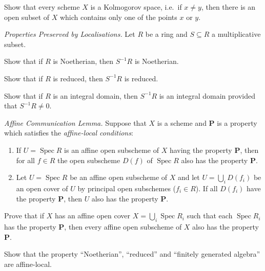 \documentclass[12pt]{book}
\theoremstyle{definition}
\DeclareMathOperator{\Spec}{Spec}
\begin{document}
	\begin{problems}
		\item Show that every scheme $X$ is a Kolmogorov space, i.e.~if $x \neq y$, then there is an open subset of $X$ which contains only one of the points $x$ or $y$.
		
		
		\item\label{chap5:properties-preserved-by-localisations} \textit{Properties Preserved by Localisations.} Let $R$ be a ring and $S \subseteq R$ a multiplicative subset.
		\begin{problems}
			\item Show that if $R$ is Noetherian, then $S^{-1}R$ is Noetherian.
			
			\item Show that if $R$ is reduced, then $S^{-1}R$ is reduced.
			
			\item Show that if $R$ is an integral domain, then $S^{-1}R$ is an integral domain provided that $S^{-1}R \neq 0$.
		\end{problems} 
		
		\item \textit{Affine Communication Lemma.} Suppose that $X$ is a scheme and $\mathbf{P}$ is a property which satisfies the \textit{affine-local conditions}:
		\begin{enumerate}
			\item If $U = \Spec R$ is an affine open subscheme of $X$ having the property $\mathbf{P}$, then for all $f \in R$ the open subscheme $D(f)$ of $\Spec R$ also has the property $\mathbf{P}$.
			
			\item Let $U = \Spec R$ be an affine open subscheme of $X$ and let $U = \bigcup_i D(f_i)$ be an open cover of $U$ by principal open subschemes ($f_i \in R$). If all $D(f_i)$ have the property $\mathbf{P}$, then $U$ also has the property $\mathbf{P}$.
		\end{enumerate}
		Prove that if $X$ has an affine open cover $X = \bigcup_i \Spec R_i$ such that each $\Spec R_i$ has the property $\mathbf{P}$, then every affine open subscheme of $X$ also has the property $\mathbf{P}$.
		
		\item Show that the property ``Noetherian'', ``reduced'' and ``finitely generated algebra'' are affine-local.
	\end{problems}
	
	
	
\end{document}
